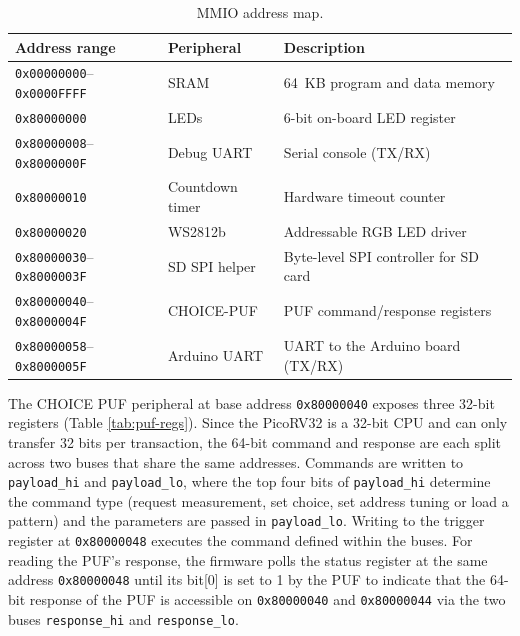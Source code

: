 \begin{table}[ht!]
\centering
\caption{MMIO address map.}
\begin{tabular}{lll}
\hline
\textbf{Address range} & \textbf{Peripheral} & \textbf{Description} \\
\hline
\texttt{0x00000000}--\texttt{0x0000FFFF} & SRAM            & 64~KB program and data memory \\
\texttt{0x80000000}                      & LEDs            & 6-bit on-board LED register \\
\texttt{0x80000008}--\texttt{0x8000000F} & Debug UART      & Serial console (TX/RX) \\
\texttt{0x80000010}                      & Countdown timer & Hardware timeout counter \\
\texttt{0x80000020}                      & WS2812b         & Addressable RGB LED driver \\
\texttt{0x80000030}--\texttt{0x8000003F} & SD SPI helper   & Byte-level SPI controller for SD card \\
\texttt{0x80000040}--\texttt{0x8000004F} & CHOICE-PUF      & PUF command/response registers \\
\texttt{0x80000058}--\texttt{0x8000005F} & Arduino UART    & UART to the Arduino board (TX/RX) \\
\hline
\end{tabular}
\label{tab:mmio-map}
\end{table}

The CHOICE PUF peripheral at base address \verb|0x80000040| exposes three 32-bit registers (Table \ref{tab:puf-regs}). Since the PicoRV32 is a 32-bit CPU and can only transfer 32 bits per transaction, the 64-bit command and response are each split across two buses that share the same addresses. Commands are written to \verb|payload_hi| and \verb|payload_lo|, where the top four bits of \verb|payload_hi| determine the command type (request measurement, set choice, set address tuning or load a pattern) and the parameters are passed in \verb|payload_lo|. Writing to the trigger register at \verb|0x80000048| executes the command defined within the buses. For reading the PUF's response, the firmware polls the status register at the same address \verb|0x80000048| until its bit[0] is set to 1 by the PUF to indicate that the 64-bit response of the PUF is accessible on \verb|0x80000040| and \verb|0x80000044| via the two buses \verb|response_hi| and \verb|response_lo|.



